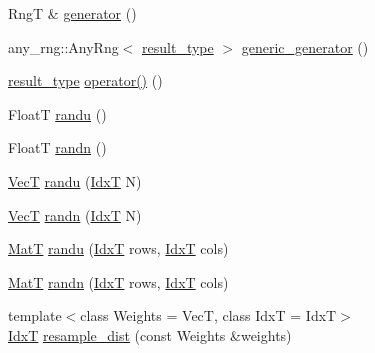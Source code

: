 \begin{DoxyCompactItemize}
\item 
RngT \& \hyperlink{classparallel__rng_1_1ParallelRngManager_a00c61e3387693dce69cc8227a5114494}{generator} ()
\item 
any\+\_\+rng\+::\+Any\+Rng$<$ \hyperlink{classparallel__rng_1_1ParallelRngManager_a199ad0d83c322a1f4415280002dcb386}{result\+\_\+type} $>$ \hyperlink{classparallel__rng_1_1ParallelRngManager_ac3109130042d1292626312fe92164064}{generic\+\_\+generator} ()
\item 
\hyperlink{classparallel__rng_1_1ParallelRngManager_a199ad0d83c322a1f4415280002dcb386}{result\+\_\+type} \hyperlink{classparallel__rng_1_1ParallelRngManager_ab94314c0bea77cfb072c4ae272805262}{operator()} ()
\item 
FloatT \hyperlink{classparallel__rng_1_1ParallelRngManager_ae739518cd6d23a283e38f8e3d1e1608b}{randu} ()
\item 
FloatT \hyperlink{classparallel__rng_1_1ParallelRngManager_a5de4e9e9d6e29912c7433b5c3b447ec9}{randn} ()
\item 
\hyperlink{classparallel__rng_1_1ParallelRngManager_a85a7225592fc063e7c0bb6d1c947f177}{VecT} \hyperlink{classparallel__rng_1_1ParallelRngManager_a19a2e2c003cb33b41b9b7698520a103f}{randu} (\hyperlink{namespaceparallel__rng_aa22fa3e339aee5927780aac099dfc6f3}{IdxT} N)
\item 
\hyperlink{classparallel__rng_1_1ParallelRngManager_a85a7225592fc063e7c0bb6d1c947f177}{VecT} \hyperlink{classparallel__rng_1_1ParallelRngManager_abb5c39dbd2645d8613762353a5004c50}{randn} (\hyperlink{namespaceparallel__rng_aa22fa3e339aee5927780aac099dfc6f3}{IdxT} N)
\item 
\hyperlink{classparallel__rng_1_1ParallelRngManager_af73ca29a72b66f92794f435a6163770d}{MatT} \hyperlink{classparallel__rng_1_1ParallelRngManager_a662041dbc151464056feb403e0dc8180}{randu} (\hyperlink{namespaceparallel__rng_aa22fa3e339aee5927780aac099dfc6f3}{IdxT} rows, \hyperlink{namespaceparallel__rng_aa22fa3e339aee5927780aac099dfc6f3}{IdxT} cols)
\item 
\hyperlink{classparallel__rng_1_1ParallelRngManager_af73ca29a72b66f92794f435a6163770d}{MatT} \hyperlink{classparallel__rng_1_1ParallelRngManager_ad58c85e40c34638c9388cebd7cb68eed}{randn} (\hyperlink{namespaceparallel__rng_aa22fa3e339aee5927780aac099dfc6f3}{IdxT} rows, \hyperlink{namespaceparallel__rng_aa22fa3e339aee5927780aac099dfc6f3}{IdxT} cols)
\item 
{\footnotesize template$<$class Weights  = VecT, class IdxT  = IdxT$>$ }\\\hyperlink{namespaceparallel__rng_aa22fa3e339aee5927780aac099dfc6f3}{IdxT} \hyperlink{classparallel__rng_1_1ParallelRngManager_add4bd5a95d4923135406e4b9eb72737d}{resample\+\_\+dist} (const Weights \&weights)

\end{DoxyCompactItemize}

